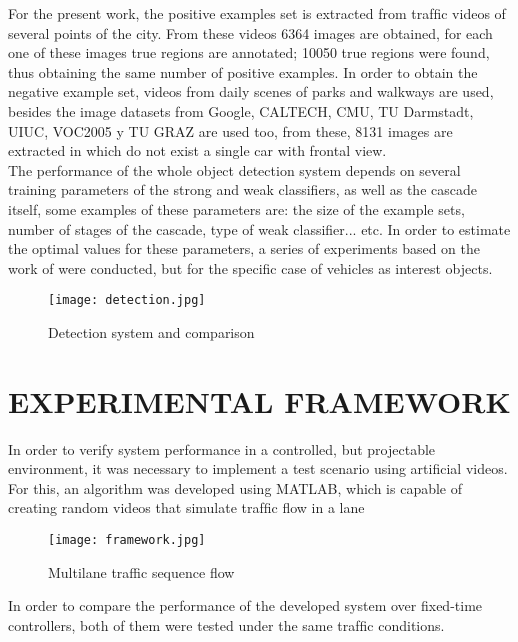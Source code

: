 \documentclass{SureshLimkar}
\begin{document}
\hspace {0.5 in} For the present work, the positive examples set is extracted
 from trafﬁc videos of several points of the city. From these videos 6364 images are obtained, for
each one of these images true regions are annotated; 10050
true regions were found, thus obtaining the same number of
positive examples. In order to obtain the negative example
set, videos from daily scenes of parks and walkways are used,
besides the image datasets from Google, CALTECH, CMU,
TU Darmstadt, UIUC, VOC2005 y TU GRAZ are used too,
from these, 8131 images are extracted in which do not exist
a single car with frontal view.
\\
\hspace {0.5 in} The performance of the whole object detection system
depends on several training parameters of the strong and weak
classiﬁers, as well as the cascade itself, some examples of
these parameters are: the size of the example sets, number of
stages of the cascade, type of weak classiﬁer... etc. In order
to estimate the optimal values for these parameters, a series
of experiments based on the work of were conducted, but
for the speciﬁc case of vehicles as interest objects.
\\

\begin{figure}[h]%
\centering
 \texttt{[image: detection.jpg]}%
\caption{Detection system and comparison}%
\label{Detection and comparison}%
\end{figure}

\chapter{EXPERIMENTAL FRAMEWORK}

\hspace {0.5 in} In order to verify system performance in a controlled, but
projectable environment, it was necessary to implement a
test scenario using artiﬁcial videos. For this, an algorithm
was developed using MATLAB, which is capable of creating
random videos that simulate trafﬁc ﬂow in a lane
\\

\begin{figure}[h]%
\centering
 \texttt{[image: framework.jpg]}%
\caption{Multilane traffic sequence flow}%
\label{Multilane traffic sequence flow}%
\end{figure}

\hspace {0.5 in} In order to compare the performance of the developed
system over ﬁxed-time controllers, both of them were tested
under the same trafﬁc conditions.
\\
\end{document}
